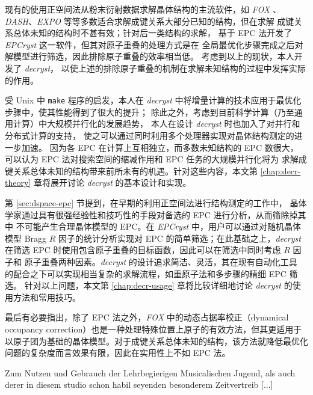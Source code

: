 现有的使用正空间法从粉末衍射数据求解晶体结构的主流软件，如 \emph{FOX}%
\parencite{favre2002}、\emph{DASH}\parencite{david2006}、\emph{EXPO}%
\parencite{altomare2013}等等多数适合求解成键关系大部分已知的结构，但在求解
成键关系总体未知的结构时不甚有效；针对后一类结构的求解，\textcite{deng2011}%
基于 EPC 法开发了 \emph{EPCryst} 这一软件，但其对原子重叠的处理方式是在
全局最优化步骤完成之后对解模型进行筛选，因此排除原子重叠的效率相当低。
考虑到以上的现状，本人开发了 \emph{decryst}\parencite{liu2018}，
以使上述的排除原子重叠的机制在求解未知结构的过程中发挥实际的作用。

受 Unix 中 \verb|make| 程序\parencite{feldman1979}的启发，本人在
\emph{decryst} 中将增量计算的技术应用于最优化步骤中，使其性能得到了很大的提升；
除此之外，考虑到目前科学计算（乃至通用计算）中大规模并行化的发展趋势，
本人在设计 \emph{decryst} 时也加入了对并行和分布式计算的支持，
使之可以通过同时利用多个处理器实现对晶体结构测定的进一步加速。
因为各 EPC 在计算上互相独立，而多数未知结构的 EPC 数很大，
可以认为 EPC 法对搜索空间的缩减作用和 EPC 任务的大规模并行化将为
求解成键关系总体未知的结构带来前所未有的机遇。针对这些内容，本文第
\ref{chap:decr-theory} 章将展开讨论 \emph{decryst} 的基本设计和实现。

第 \ref{sec:dspace-epc} 节提到，在早期的利用正空间法进行结构测定的工作中，
晶体学家通过具有很强经验性和技巧性的手段对备选的 EPC 进行分析，从而筛除掉其中
不可能产生合理晶体模型的 EPC。在 \emph{EPCryst} 中，用户可以通过对随机晶体模型
Bragg $R$ 因子的统计分析实现对 EPC 的简单筛选；在此基础之上，\emph{decryst}
在筛选 EPC 时使用包含原子重叠的目标函数，因此可以在筛选中同时考虑 $R$ 因子和
原子重叠两种因素。\emph{decryst} 的设计追求简洁、灵活，其在现有自动化工具
的配合之下可以实现相当复杂的求解流程，如重原子法和多步骤的精细 EPC 筛选。
针对以上问题，本文第 \ref{chap:decr-usage} 章将比较详细地讨论 \emph{decryst}
的使用方法和常用技巧。

最后有必要指出，除了 EPC 法之外，\emph{FOX} 中的动态占据率校正（dynamical
occupancy correction）也是一种处理特殊位置上原子的有效方法，但其更适用于
以原子团为基础的晶体模型。对于成键关系总体未知的结构，该方法就降低最优化
问题的复杂度而言效果有限，因此在实用性上不如 EPC 法。

\begin{rquote}{0.2\textwidth}
	Zum Nutzen und Gebrauch der Lehrbegierigen
	Musicalischen Jugend, als auch derer in diesem
	studio schon habil seyenden besonderem Zeitvertreib [...]
\end{rquote}

